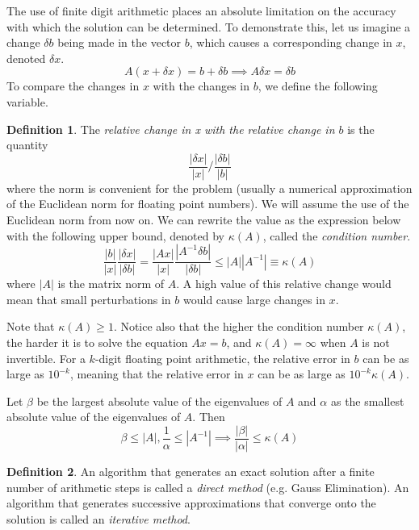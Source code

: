 \documentclass{article}
\theoremstyle{remark}
\theoremstyle{definition}
\newtheorem{definition}{Definition}[section]
\begin{document}
The use of finite digit arithmetic places an absolute limitation on the accuracy with which the solution can be determined. To demonstrate this, let us imagine a change $\delta b$ being made in the vector $b$, which causes a corresponding change in $x$, denoted $\delta x$. 
\[A(x + \delta x) = b + \delta b \implies A \delta x = \delta b\]
To compare the changes in $x$ with the changes in $b$, we define the following variable. 
\begin{definition}
The \textit{relative change in x with the relative change in $b$} is the quantity
\[\frac{|\delta x|}{|x|} \bigg/ \frac{|\delta b|}{|b|}\]
where the norm is convenient for the problem (usually a numerical approximation of the Euclidean norm for floating point numbers). We will assume the use of the Euclidean norm from now on. We can rewrite the value as the expression below with the following upper bound, denoted by $\kappa (A)$, called the \textit{condition number}. 
\[\frac{|b|}{|x|} \frac{|\delta x|}{|\delta b|} = \frac{|Ax|}{|x|} \frac{|A^{-1} \delta b|}{|\delta b|} \leq |A||A^{-1}| \equiv \kappa (A)\]
where $|A|$ is the matrix norm of $A$. 
A high value of this relative change would mean that small perturbations in $b$ would cause large changes in $x$.
\end{definition}

Note that $\kappa(A) \geq 1$. Notice also that the higher the condition number $\kappa (A)$, the harder it is to solve the equation $A x = b$, and $\kappa(A) = \infty$ when $A$ is not invertible. For a $k$-digit floating point arithmetic, the relative error in $b$ can be as large as $10^{-k}$, meaning that the relative error in $x$ can be as large as $10^{-k} \kappa (A)$. 

Let $\beta$ be the largest absolute value of the eigenvalues of $A$ and $\alpha$ as the smallest absolute value of the eigenvalues of $A$. Then 
\[\beta \leq |A|, \frac{1}{\alpha} \leq |A^{-1}| \implies \frac{|\beta|}{|\alpha|} \leq \kappa(A)\]


\begin{definition}
An algorithm that generates an exact solution after a finite number of arithmetic steps is called a \textit{direct method} (e.g. Gauss Elimination). An algorithm that generates successive approximations that converge onto the solution is called an \textit{iterative method}. 
\end{definition}
\end{document}
